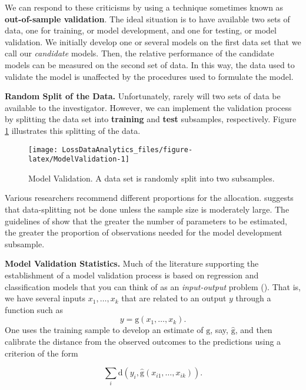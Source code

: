 \documentclass[]{book}
\theoremstyle{definition}
\theoremstyle{definition}
\theoremstyle{definition}
\theoremstyle{remark}
\begin{document}
We can respond to these criticisms by using a technique sometimes known
as \textbf{out-of-sample validation}. The ideal situation is to have
available two sets of data, one for training, or model development, and
one for testing, or model validation. We initially develop one or
several models on the first data set that we call our \emph{candidate}
models. Then, the relative performance of the candidate models can be
measured on the second set of data. In this way, the data used to
validate the model is unaffected by the procedures used to formulate the
model.

\textbf{Random Split of the Data.} Unfortunately, rarely will two sets
of data be available to the investigator. However, we can implement the
validation process by splitting the data set into \textbf{training} and
\textbf{test} subsamples, respectively. Figure \ref{fig:ModelValidation}
illustrates this splitting of the data.

\begin{figure}

{\centering \texttt{[image: LossDataAnalytics\_files/figure-latex/ModelValidation-1]} 

}

\caption{Model Validation. A data set is randomly split into two subsamples.}\label{fig:ModelValidation}
\end{figure}

Various researchers recommend different proportions for the allocation.
\citet{snee1977validation} suggests that data-splitting not be done
unless the sample size is moderately large. The guidelines of
\citet{picard1990data} show that the greater the number of parameters to
be estimated, the greater the proportion of observations needed for the
model development subsample.

\textbf{Model Validation Statistics.} Much of the literature supporting
the establishment of a model validation process is based on regression
and classification models that you can think of as an
\emph{input-output} problem (\citet{james2013introduction}). That is, we
have several inputs \(x_1, \ldots, x_k\) that are related to an output
\(y\) through a function such as
\[y = \mathrm{g}\left(x_1, \ldots, x_k\right).\] One uses the training
sample to develop an estimate of \(\mathrm{g}\), say,
\(\hat{\mathrm{g}}\), and then calibrate the distance from the observed
outcomes to the predictions using a criterion of the form

\begin{equation}
\sum_i \mathrm{d}(y_i,\hat{\mathrm{g}}\left(x_{i1}, \ldots, x_{ik}\right) ) .
\label{eq:OutSampleCriter}
\end{equation}
\end{document}
